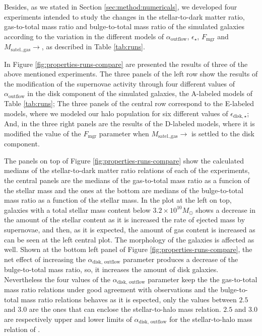 \documentclass[usenatbib]{mn2e}
\begin{document}
Besides, as we stated in Section \ref{sec:method:numericals}, we developed four experiments intended to study the changes in the stellar-to-dark matter ratio, 
gas-to-total mass ratio and bulge-to-total mass ratio of the simulated galaxies according to the variation in the different models of $\alpha_{\text{outflow}}$,
 $\epsilon_\star$, $F_{\text{mgr}}$ and  $M_{\text{satel.,gas}}\to$, as described in  Table \ref{tab:runs}. 

In Figure \ref{fig:properties-runs-compare} are presented the results of three of the above mentioned experiments. The three panels of the left row show
the results of the modification of the supernovae activity through four different values of $\alpha_{\text{outflow}}$ in the disk component of the 
simulated galaxies, the A-labeled models of Table \ref{tab:runs}; The three panels of the central row correspond to the E-labeled models,
where we modeled our halo population for six different values of $\epsilon_{\text{disk},\star}$; And, in the three right panels are the results of the D-labeled 
models, where it is modified the value of the $F_{\text{mgr}}$ parameter when $M_{\text{satel.,gas}}\to$ is settled to the disk component. 

The panels on top of
 Figure \ref{fig:properties-runs-compare} show the calculated medians of the stellar-to-dark matter ratio relations of each of the experiments, the central panels are the 
medians of the gas-to-total mass ratio as a funcion of the stellar mass and the ones at the bottom are medians of the bulge-to-total mass ratio as a function of the stellar mass. 
In the plot at the left on top, galaxies with a total stellar mass content below $3.2\times 10^{10}M_{\odot}$ shows a decrease in the amount of the stellar 
content as it is increased the rate of ejected mass by supernovae, and then, as it is expected, the amount of gas content is increased as can be seen 
at the left central plot. The morphology of the galaxies is affected as well. Shown at the bottom left panel of Figure \ref{fig:properties-runs-compare}, the
 net effect of increasing the $\alpha_{\text{disk, outflow}}$ parameter produces a decrease of the bulge-to-total mass ratio, so, it increases the amount 
of disk galaxies. Nevertheless the four values of the $\alpha_{\text{disk, outflow}}$ parameter keep the the gas-to-total mass ratio relations under good 
agreement with observations and the bulge-to-total mass ratio relations behaves as it is espected, only the values between $2.5$  and $3.0$ are the ones that
can enclose the stellar-to-halo mass relation. $2.5$  and $3.0$ are respectively  upper and lower limits of $\alpha_{\text{disk, outflow}}$ for the 
stellar-to-halo mass relation of \cite{2010ApJ...710..903M}.
\end{document}
